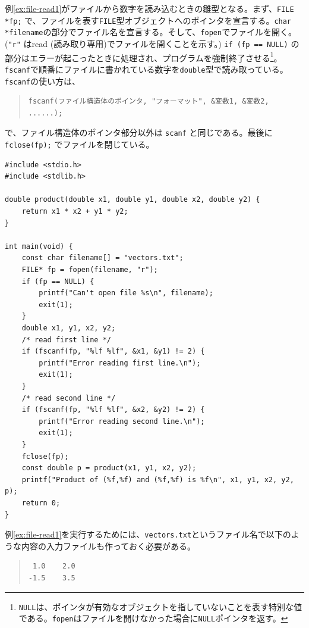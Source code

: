 例\ref{ex:file-read1}がファイルから数字を読み込むときの雛型となる。まず、\texttt{FILE *fp;} で、ファイルを表す\texttt{FILE}型オブジェクトへのポインタを宣言する。\texttt{char *filename}の部分でファイル名を宣言する。そして、\texttt{fopen}でファイルを開く。(\texttt{"r"} はread (読み取り専用)でファイルを開くことを示す。) \texttt{if (fp == NULL){}} の部分はエラーが起こったときに処理され、プログラムを強制終了させる\footnote{\texttt{NULL}は、ポインタが有効なオブジェクトを指していないことを表す特別な値である。\texttt{fopen}はファイルを開けなかった場合に\texttt{NULL}ポインタを返す。}。\texttt{fscanf}で順番にファイルに書かれている数字を\texttt{double}型で読み取っている。\texttt{fscanf}の使い方は、
\begin{quote}
    \begin{verbatim}
fscanf(ファイル構造体のポインタ, "フォーマット", &変数1, &変数2, ......);
\end{verbatim}
\end{quote}
で、ファイル構造体のポインタ部分以外は \texttt{scanf} と同じである。最後に \texttt{fclose(fp);} でファイルを閉じている。
\begin{reidai}\label{ex:file-read1}
    \begin{verbatim}
#include <stdio.h>
#include <stdlib.h>

double product(double x1, double y1, double x2, double y2) {
    return x1 * x2 + y1 * y2;
}

int main(void) {
    const char filename[] = "vectors.txt";
    FILE* fp = fopen(filename, "r");
    if (fp == NULL) {
        printf("Can't open file %s\n", filename);
        exit(1);
    }
    double x1, y1, x2, y2;
    /* read first line */
    if (fscanf(fp, "%lf %lf", &x1, &y1) != 2) {
        printf("Error reading first line.\n");
        exit(1);
    }
    /* read second line */
    if (fscanf(fp, "%lf %lf", &x2, &y2) != 2) {
        printf("Error reading second line.\n");
        exit(1);
    }
    fclose(fp);
    const double p = product(x1, y1, x2, y2);
    printf("Product of (%f,%f) and (%f,%f) is %f\n", x1, y1, x2, y2, p);
    return 0;
}
\end{verbatim}
\end{reidai} \noindent
例\ref{ex:file-read1}を実行するためには、\texttt{vectors.txt}というファイル名で以下のような内容の入力ファイルも作っておく必要がある。
\begin{quote}
    \begin{verbatim}
 1.0    2.0
-1.5    3.5
\end{verbatim}
\end{quote}
